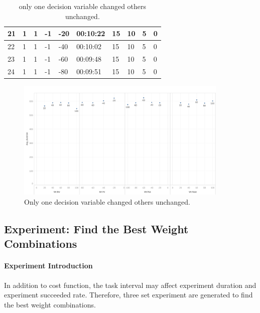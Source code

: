 \begin{table}[]
{\begin{tabular}{|l|l|l|l|l|l|l|l|l|l|}
21      & 1       & 1        & -1      & -20     & 00:10:22 & 15    & 10        & 5       & 0        \\ \hline
22      & 1       & 1        & -1      & -40     & 00:10:02 & 15    & 10        & 5       & 0        \\ \hline
23      & 1       & 1        & -1      & -60     & 00:09:48 & 15    & 10        & 5       & 0        \\ \hline
24      & 1       & 1        & -1      & -80     & 00:09:51 & 15    & 10        & 5       & 0        \\ \hline
\end{tabular}}
\caption{only one decision variable changed others unchanged.}
\label{tab:only_one_decision_variable_changed}
\end{table}

\begin{figure}[htbp]
    \centering
    \includegraphics[width = 0.9\textwidth]{content/images/ch5/one_decision_variable.png}
    \caption{Only one decision variable changed others unchanged.}
    \label{fig:only_one_decision_variable_changed}
\end{figure}

\subsection{Experiment: Find the Best Weight Combinations}
\paragraph{Experiment Introduction}
In addition to cost function, the task interval may affect experiment duration and experiment succeeded rate. Therefore, three set experiment are generated to find the best weight combinations. 
 
